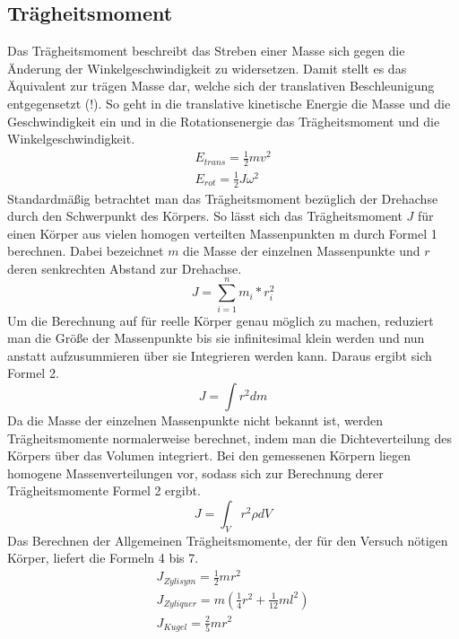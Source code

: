 \documentclass[titlepage = firstcover]{scrartcl}
\begin{document}
      \subsection{Trägheitsmoment}
      Das Trägheitsmoment beschreibt das Streben einer Masse sich gegen die Änderung der Winkelgeschwindigkeit zu widersetzen. Damit stellt es 
      das Äquivalent zur trägen Masse dar, welche sich der translativen Beschleunigung entgegensetzt (!). So geht in die translative kinetische Energie
      die Masse und die Geschwindigkeit ein und in die Rotationsenergie das Trägheitsmoment und die Winkelgeschwindigkeit.
      \begin{align}
        E_{trans} = \frac{1}{2} mv^2 \\
        E_{rot} = \frac{1}{2}J \omega^2
      \end{align}
      Standardmäßig betrachtet man das Trägheitsmoment bezüglich der Drehachse durch den Schwerpunkt des Körpers. So lässt sich das Trägheitsmoment 
      $J$ für einen Körper aus vielen homogen verteilten Massenpunkten m durch Formel 1 berechnen. Dabei bezeichnet $m$ die Masse der einzelnen 
      Massenpunkte und $r$ deren senkrechten Abstand zur Drehachse.
      \begin{equation}
        J = \sum_{i=1}^n m_i * r_i^2
      \end{equation}
      Um die Berechnung auf für reelle Körper genau möglich zu machen, reduziert man die Größe der Massenpunkte bis sie infinitesimal klein werden und  
      nun anstatt aufzusummieren über sie Integrieren werden kann. Daraus ergibt sich Formel 2.
      \begin{equation}
        J = \int r^2 dm
      \end{equation}
      Da die Masse der einzelnen Massenpunkte nicht bekannt ist, werden Trägheitsmomente normalerweise berechnet, indem man die Dichteverteilung des Körpers 
      über das Volumen integriert. Bei den gemessenen Körpern liegen homogene Massenverteilungen vor, sodass sich zur Berechnung derer Trägheitsmomente 
      Formel 2 ergibt.  
      \begin{equation}
        J = \int_V r^2 \rho dV
      \end{equation}
      Das Berechnen der Allgemeinen Trägheitsmomente, der für den Versuch nötigen Körper, liefert die Formeln 4 bis 7.
      \begin{align}
        J_{Zylisym} = \frac{1}{2}mr^2 \\
        J_{Zyliquer} = m(\frac{1}{4}r^2 + \frac{1}{12}ml^2) \\
        J_{Kugel} = \frac{2}{5}mr^2
      \end{align}
\end{document}
